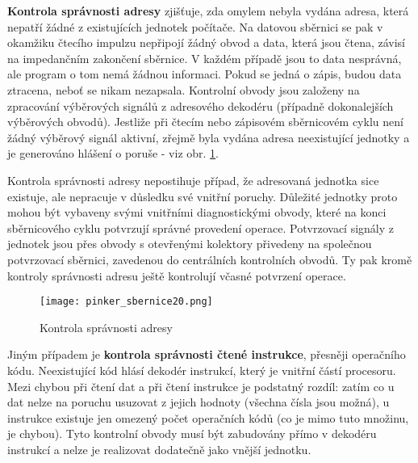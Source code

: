       \textbf{Kontrola správnosti adresy} zjišťuje, zda omylem nebyla vydána adresa, která nepatří 
      žádné z existujících jednotek počítače. Na datovou sběrnici se pak v okamžiku čtecího impulzu 
      nepřipojí žádný obvod a data, která jsou čtena, závisí na impedančním zakončení sběrnice. V 
      každém případě jsou to data nesprávná, ale program o tom nemá žádnou informaci. Pokud se 
      jedná o zápis, budou data ztracena, neboť se nikam nezapsala. Kontrolní obvody jsou založeny 
      na zpracování výběrových signálů z adresového dekodéru (případně dokonalejších výběrových 
      obvodů). Jestliže při čtecím nebo zápisovém sběrnicovém cyklu není žádný výběrový signál 
      aktivní, zřejmě byla vydána adresa neexistující jednotky a je generováno hlášení o poruše - 
      viz obr. \ref{MIT:fig_sbernice20}.
      
      Kontrola správnosti adresy nepostihuje případ, že adresovaná jednotka sice existuje, ale 
      nepracuje v důsledku své vnitřní poruchy. Důležité jednotky proto mohou být vybaveny svými 
      vnitřními diagnostickými obvody, které na konci sběrnicového cyklu potvrzují správné 
      provedení operace. Potvrzovací signály z jednotek jsou přes obvody s otevřenými kolektory 
      přivedeny na společnou potvrzovací sběrnici, zavedenou do centrálních kontrolních obvodů. Ty 
      pak kromě kontroly správnosti adresu ještě kontrolují včasné 
      potvrzení operace.
      
      \begin{figure}[ht!] %
        \centering
        \texttt{[image: pinker\_sbernice20.png]}
        \caption{Kontrola správnosti adresy}
        \label{MIT:fig_sbernice20}
      \end{figure}
      
      Jiným případem je \textbf{kontrola správnosti čtené instrukce}, přesněji operačního kódu. 
      Neexistující kód hlásí dekodér instrukcí, který je vnitřní částí procesoru. Mezi chybou při 
      čtení dat a při čtení instrukce je podstatný rozdíl: zatím co u dat nelze na poruchu usuzovat 
      z jejich hodnoty (všechna čísla jsou možná), u instrukce existuje jen omezený počet 
      operačních kódů (co je mimo tuto množinu, je chybou). Tyto kontrolní obvody musí být 
      zabudovány přímo v dekodéru instrukcí a nelze je realizovat dodatečně jako vnější jednotku.
      
